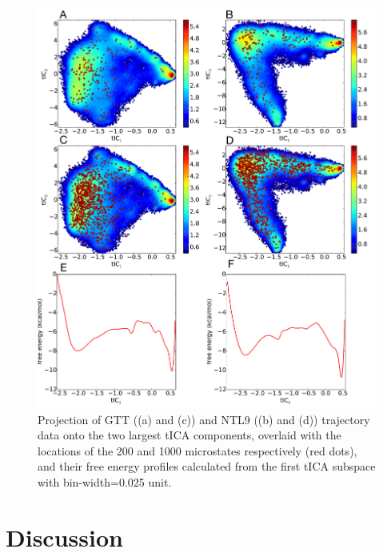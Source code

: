\documentclass[%
 aip,
rsi,%
 amsmath,amssymb,
 reprint,%
]{revtex4-1}
\begin{document}
\begin{figure}
\includegraphics[width=0.8\paperwidth]{figures/tICA_subspace/tica_and_free_energy_GTT_NTL9.pdf}
\caption{Projection of GTT ((a) and (c)) and NTL9 ((b) and (d)) trajectory data onto the two largest tICA components, overlaid with the locations of the 200 and 1000 microstates respectively (red dots), and their free energy profiles calculated from the first tICA subspace with bin-width=0.025 unit.}
\end{figure}





\section{Discussion}
\end{document}
